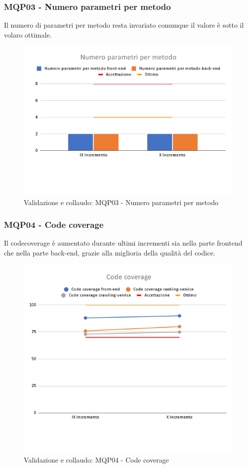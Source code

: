 \subsubsection{MQP03 - Numero parametri per metodo}
Il numero di parametri per metodo resta invariato comunque il valore è sotto il volaro ottimale.
\begin{figure}[H]
    \centering
    \includegraphics[scale=0.50]{Sezioni/images/last_prodotto/Numero_parametri_per_metodo.png}
    \caption{Validazione e collaudo: MQP03 - Numero parametri per metodo}
\end{figure}
\subsubsection{MQP04 - Code coverage}
Il codecoverage è aumentato durante ultimi incrementi sia nella parte frontend che nella parte back-end, grazie alla miglioria della qualità del codice.
\begin{figure}[H]
    \centering
    \includegraphics[scale=0.50]{Sezioni/images/last_prodotto/Code_coverage.png}
    \caption{Validazione e collaudo: MQP04 - Code coverage}
\end{figure}
